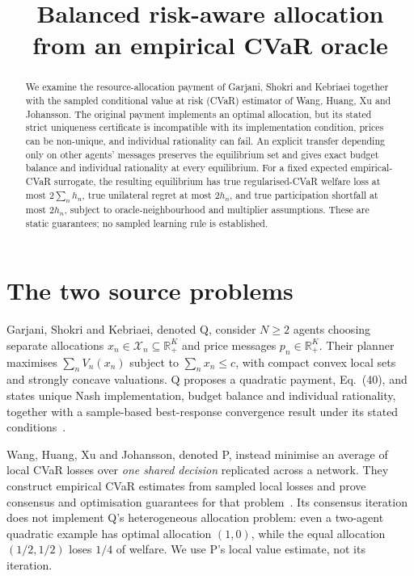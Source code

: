 \documentclass{article}
\title{Balanced risk-aware allocation from an empirical CVaR oracle}
\begin{document}
\maketitle

\begin{abstract}
We examine the resource-allocation payment of Garjani, Shokri and Kebriaei together with the sampled conditional value at risk (CVaR) estimator of Wang, Huang, Xu and Johansson. The original payment implements an optimal allocation, but its stated strict uniqueness certificate is incompatible with its implementation condition, prices can be non-unique, and individual rationality can fail. An explicit transfer depending only on other agents' messages preserves the equilibrium set and gives exact budget balance and individual rationality at every equilibrium. For a fixed expected empirical-CVaR surrogate, the resulting equilibrium has true regularised-CVaR welfare loss at most \(2\sum_n h_n\), true unilateral regret at most \(2h_n\), and true participation shortfall at most \(2h_n\), subject to oracle-neighbourhood and multiplier assumptions. These are static guarantees; no sampled learning rule is established. %
\end{abstract}

\section{The two source problems}
Garjani, Shokri and Kebriaei, denoted Q, consider \(N\geq2\) agents choosing separate allocations \(x_n\in\mathcal X_n\subseteq\mathbb R_+^K\) and price messages \(p_n\in\mathbb R_+^K\). Their planner maximises \(\sum_n V_n(x_n)\) subject to \(\sum_nx_n\leq c\), with compact convex local sets and strongly concave valuations. Q proposes a quadratic payment, Eq.~(40), and states unique Nash implementation, budget balance and individual rationality, together with a sample-based best-response convergence result under its stated conditions~\cite{garjani2026mechanism}. %

Wang, Huang, Xu and Johansson, denoted P, instead minimise an average of local CVaR losses over \emph{one shared decision} replicated across a network. They construct empirical CVaR estimates from sampled local losses and prove consensus and optimisation guarantees for that problem~\cite{wang2026distributed}. Its consensus iteration does not implement Q's heterogeneous allocation problem: even a two-agent quadratic example has optimal allocation \((1,0)\), while the equal allocation \((1/2,1/2)\) loses \(1/4\) of welfare. We use P's local value estimate, not its iteration. %
\end{document}
